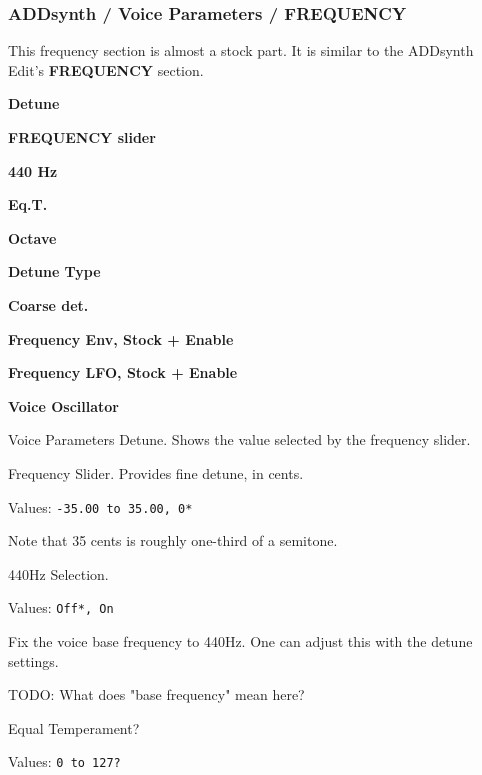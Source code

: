 \subsubsection{ADDsynth / Voice Parameters / FREQUENCY}
\label{subsubsec:addsynth_voice_parameters_frequency}

   This frequency section is almost a stock part.
   It is similar to the ADDsynth Edit's \textbf{FREQUENCY} section.

   \begin{enumber}
      \item \textbf{Detune}
      \item \textbf{FREQUENCY slider}
      \item \textbf{440 Hz}         %
      \item \textbf{Eq.T.}          %
      \item \textbf{Octave}
      \item \textbf{Detune Type}
      \item \textbf{Coarse det.}
      \item \textbf{Frequency Env, Stock + Enable}
      \item \textbf{Frequency LFO, Stock + Enable}
      \item \textbf{Voice Oscillator}
   \end{enumber}

   \setcounter{ItemCounter}{0}      %

   Voice Parameters Detune.
   Shows the value selected by the frequency slider.

   Frequency Slider.
   Provides fine detune, in cents.

   Values: \texttt{-35.00 to 35.00, 0*}

   Note that 35 cents is roughly one-third of a semitone.

   440Hz Selection.

   Values: \texttt{Off*, On}

   Fix the voice base frequency to 440Hz.
   One can adjust this with the detune settings.

   TODO: What does "base frequency" mean here?

   Equal Temperament?

   Values: \texttt{0 to 127?}

